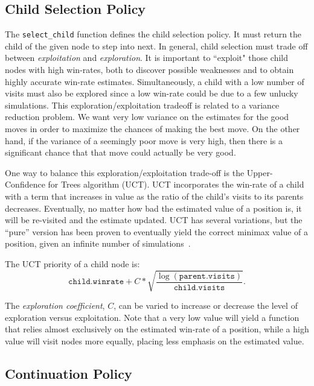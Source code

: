 \documentclass{acm_proc_article-sp}
\begin{document}
\subsection{Child Selection Policy}
The \verb+select_child+ function defines the child selection policy. It must return the child of the given node to step into next. 
In general, child selection must trade off between \emph{exploitation} and \emph{exploration}. 
It is important to ``exploit" those child nodes with high win-rates, both
to discover possible weaknesses and to obtain highly accurate win-rate estimates. 
Simultaneously, a child with a low number of visits must also be explored since a low win-rate
could be due to a few unlucky simulations.
This exploration/exploitation tradeoff is related to a variance reduction problem.  
We want very low variance on the estimates for the good moves in order to maximize the chances of making the best move.
On the other hand, if the variance of a seemingly poor move is very high, then there is a significant chance that that move
could actually be very good.

One way to balance this exploration/exploitation trade-off is the Upper-Confidence for Trees algorithm (UCT). 
UCT incorporates the win-rate of a child with a term that increases in value as the ratio of the child's visits to its parents decreases. 
Eventually, no matter how bad the estimated value of a position is, it will be re-visited and the estimate updated. 
UCT has several variations, but the ``pure'' version has been proven to eventually yield the correct minimax value of a position, given an infinite number of simulations~\cite{gelly2006exploration}.

The UCT priority of a child node is:
\[
	\texttt{child.winrate} + C*\sqrt{\frac{\log{(\texttt{parent.visits})}}{\texttt{child.visits}}}.
\]

The \emph{exploration coefficient}, $C$, can be varied to increase or decrease the level of exploration versus exploitation. Note that a very low value will yield a function that relies almost exclusively on the estimated win-rate of a position, while a high value will visit nodes more equally, placing less emphasis on the estimated value.

\subsection{Continuation Policy}
\end{document}
